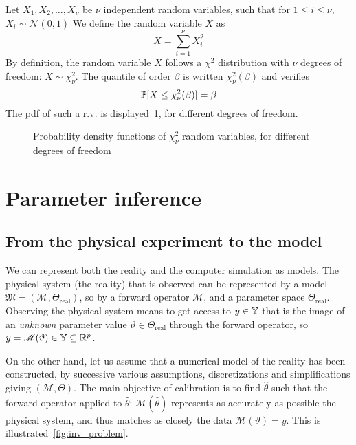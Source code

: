 \documentclass[../../Main_ManuscritThese.tex]{subfiles}
\newcommand\imgpath{/home/victor/acadwriting/Manuscrit/Text/Chapter2/img/}
\begin{document}
\begin{example}
  \label{ex:chi2}
  Let $X_1, X_2,\dots,X_{\nu}$ be $\nu$ independent random variables, such that for $1\leq i \leq \nu$, $X_i \sim \mathcal{N}(0,1)$
  We define the random variable $X$ as
  \begin{equation}
    X = \sum_{i=1}^\nu X_i^2
  \end{equation}
  By definition, the random variable $X$ follows a $\chi^2$ distribution with $\nu$ degrees of freedom: $X\sim \chi^2_{\nu}$. The quantile of order $\beta$ is written $\chi^2_{\nu}(\beta)$ and verifies
  \begin{equation}
    \mathbb{P}[X \leq \chi^2_{\nu}(\beta)] = \beta 
  \end{equation}
  The pdf of such a r.v. is displayed~\cref{fig:chi2_examples}, for different degrees of freedom.
\end{example}

\begin{figure}[ht]
  \centering
  
  \caption[Probability density functions of $\chi^2$ r.v.]{Probability density functions of $\chi^2_{\nu}$ random variables, for different degrees of freedom}
  \label{fig:chi2_examples}
\end{figure}

\clearpage

\section{Parameter inference}
\label{sec:parameter_inference}
\subsection{From the physical experiment to the model}
\label{ssec:inv_problem}
We can represent both the reality and the computer simulation as
models.  The physical system (the reality) that is observed can be
represented by a model
$\mathfrak{M}=\left(\mathscr{M},\Theta_{\mathrm{real}}\right)$, so by
a forward operator $\mathscr{M}$, and a parameter space
$\Theta_{\mathrm{real}}$.  Observing the physical system means to get
access to $y\in \mathbb{Y}$ that is the image of an \emph{unknown}
parameter value $\vartheta \in \Theta_{\mathrm{real}}$ through the
forward operator, so
$y = \mathscr{M}(\vartheta)\in \mathbb{Y} \subseteq \mathbb{R}^p$.

On the other hand, let us assume that a numerical model of the reality
has been constructed, by successive various assumptions,
discretizations and simplifications giving $(\mathcal{M},\Theta)$. The
main objective of calibration is to find $\hat{\theta}$ such that the
forward operator applied to $\hat{\theta}$:
$\mathcal{M}(\hat{\theta})$ represents as accurately as possible the
physical system, and thus matches as closely the data
$\mathscr{M}(\vartheta)=y$. This is
illustrated~\cref{fig:inv_problem}.
\end{document}

